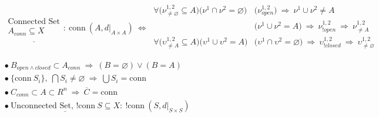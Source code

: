 \documentclass{article}
\begin{document}
\vspace{10pt}
\(
    \begin{aligned}
        & \underline{ \begin{gathered}
                \text{Connected Set}\\
                A_{conn} \subseteq X \\
            \end{gathered} }
            :\ 
            \text{conn}\ (A, d|_{A\times A})
            \ \Leftrightarrow\ 
            \begin{aligned}
                \forall \big( \nu^{1,2}_{\neq\varnothing} \subseteq A \big)
                    \big( \nu^1 \cap \nu^2 = \varnothing \big)
                    & \big( \nu^{1,2}_{open} \big) \ \Rightarrow\ \nu^1 \cup \nu^2 \neq A 
                    \\
                & \big( \nu^1 \cup \nu^2 = A \big) \ \Rightarrow\ \nu^{1,2}_{!open} \ \Rightarrow\ \nu^{1,2}_{\neq A}
                    \\
                \forall \big( \upsilon^{1,2}_{\neq A} \subseteq A \big)
                    \big( \upsilon^1 \cup \upsilon^2 = A \big) 
                    & \big( \upsilon^1 \cap \upsilon^2 = \varnothing \big) 
                    \ \Rightarrow\ \upsilon^{1,2}_{!closed} \ \Rightarrow\ \upsilon^{1,2}_{\neq \varnothing}
                    \\
            \end{aligned}
            \\
    \end{aligned}
\)\\[5pt]    
\(
    \begin{aligned}
        & \bullet\ B_{open \wedge closed} \subset A_{conn} \ \Rightarrow\ (B = \varnothing) \lor (B = A)\\
        & \bullet\ \{ \text{conn}\ S_i \},\ \bigcap S_i \neq \varnothing \ \Rightarrow\ \bigcup S_i = \text{conn}\\
        & \bullet\ C_{conn} \subset A \subset R^n \ \Rightarrow\ \overline{C} = \text{conn}
            \\
        & \bullet\ \underline{ \text{Unconnected Set, !conn}\ S \subseteq X } :\ \text{!conn}\ (S, d|_{S\times S})
            \\
    \end{aligned}
\)
\end{document}
